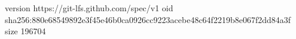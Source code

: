 version https://git-lfs.github.com/spec/v1
oid sha256:880e68549892e3f45e46b0ca0926cc9223acebe48c64f2219b8e067f2dd84a3f
size 196704
